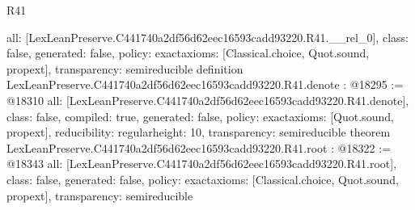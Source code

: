 \begin{lexlean}{R41}
\begin{coremodule}
{  all: [LexLeanPreserve.C441740a2df56d62eec16593cadd93220.R41.__rel_0],
  class: false,
  generated: false,
  policy: exact{axioms: [Classical.choice, Quot.sound, propext]},
  transparency: semireducible
}
definition LexLeanPreserve.C441740a2df56d62eec16593cadd93220.R41.denote : @18295 := @18310 {
  all: [LexLeanPreserve.C441740a2df56d62eec16593cadd93220.R41.denote],
  class: false,
  compiled: true,
  generated: false,
  policy: exact{axioms: [Quot.sound, propext]},
  reducibility: regular{height: 10},
  transparency: semireducible
}
theorem LexLeanPreserve.C441740a2df56d62eec16593cadd93220.R41.root : @18322 := @18343 {
  all: [LexLeanPreserve.C441740a2df56d62eec16593cadd93220.R41.root],
  class: false,
  generated: false,
  policy: exact{axioms: [Classical.choice, Quot.sound, propext]},
  transparency: semireducible
}


\end{coremodule}
\end{lexlean}
